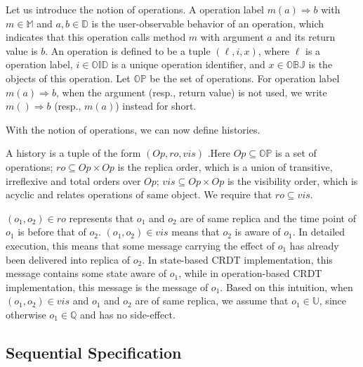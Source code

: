 Let us introduce the notion of operations. A operation label $m(a) \Rightarrow b$ with $m \in \mathbb{M}$ and $a,b \in \mathbb{D}$ is the user-observable behavior of an operation, which indicates that this operation calls method $m$ with argument $a$ and its return value is $b$. An operation is defined to be a tuple $(\ell,i,x)$, where $\ell$ is a operation label, $i \in \mathbb{OID}$ is a unique operation identifier, and $x \in \mathbb{OBJ}$ is the objects of this operation. Let $\mathbb{OP}$ be the set of operations. For operation label $m(a) \Rightarrow b$, when the argument (resp., return value) is not used, we write $m()\Rightarrow b$ (resp., $m(a)$) instead for short.

With the notion of operations, we can now define histories.

\begin{definition}[histories]
\label{definition:histories}
A history is a tuple of the form $(\mathit{Op},\mathit{ro},\mathit{vis})$ .Here $\mathit{Op} \subseteq \mathbb{OP}$ is a set of operations; $\mathit{ro} \subseteq \mathit{Op} \times \mathit{Op}$ is the replica order, which is a union of transitive, irreflexive and total orders over $\mathit{Op}$; $\mathit{vis} \subseteq \mathit{Op} \times \mathit{Op}$ is the visibility order, which is acyclic and relates operations of same object. We require that $\mathit{ro} \subseteq \mathit{vis}$.
\end{definition}

$(o_1,o_2) \in \mathit{ro}$ represents that $o_1$ and $o_2$ are of same replica and the time point of $o_1$ is before that of $o_2$. $(o_1,o_2) \in \mathit{vis}$ means that $o_2$ is aware of $o_1$. In detailed execution, this means that some message carrying the effect of $o_1$ has already been delivered into replica of $o_2$. In state-based CRDT implementation, this message contains some state aware of $o_1$, while in operation-based CRDT implementation, this message is the message of $o_1$. Based on this intuition, when $(o_1,o_2) \in \mathit{vis}$ and $o_1$ and $o_2$ are of same replica, we assume that $o_1 \in \mathbb{U}$, since otherwise $o_1 \in \mathbb{Q}$ and has no side-effect. 





\subsection{Sequential Specification}
\label{subsec:sequential specification}

